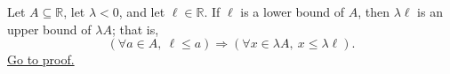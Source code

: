 \begin{proposition}
\label{prop:negative-dilation-sends-lower-to-upper-bounds}
Let $A\subseteq\mathbb{R}$, let $\lambda<0$, and let
$\ell\in\mathbb{R}$.  If $\ell$ is a lower bound of $A$, then
$\lambda\ell$ is an upper bound of $\lambda A$; that is,
\[
\left(\forall a\in A,\ \ell\leq a\right)
\Longrightarrow
\left(\forall x\in\lambda A,\ x\leq \lambda\ell\right).
\]
\hyperref[prf:negative-dilation-sends-lower-to-upper-bounds]{Go to proof.}
\end{proposition}
